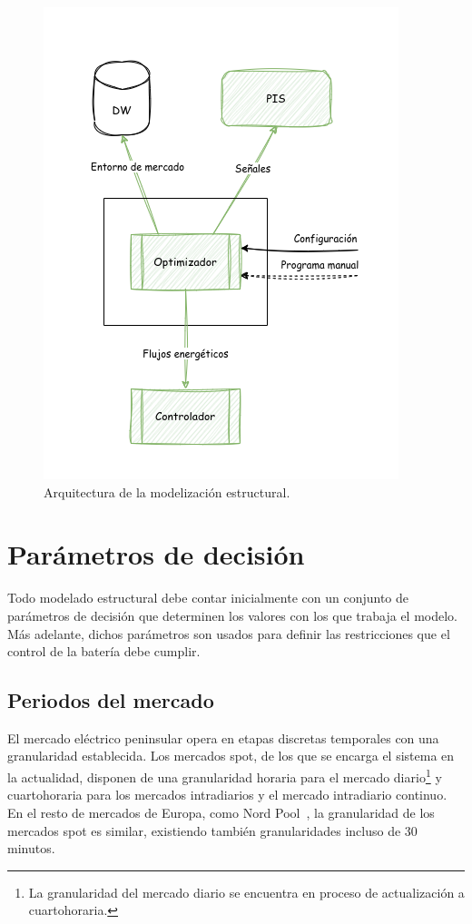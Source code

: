 \begin{figure}
  \centering
  \includegraphics[height=0.75\textheight]{figures/arquitectura-modelizacion.png}
  \caption[Arquitectura de la modelización estructural.]{Arquitectura de la modelización estructural.}%
  \label{fig:arquitectura-modelizacion}
\end{figure}

\section{Parámetros de decisión}%
\label{makereference5.1}

Todo modelado estructural debe contar inicialmente con un conjunto de parámetros de decisión que determinen los valores con los que trabaja el modelo. Más adelante, dichos parámetros son usados para definir las restricciones que el control de la batería debe cumplir.

\subsection{Periodos del mercado}%
\label{makereference5.1.1}

El mercado eléctrico peninsular opera en etapas discretas temporales con una granularidad establecida. Los mercados spot, de los que se encarga el sistema en la actualidad, disponen de una granularidad horaria para el mercado diario\footnote{La granularidad del mercado diario se encuentra en proceso de actualización a cuartohoraria.} y cuartohoraria para los mercados intradiarios y el mercado intradiario continuo. En el resto de mercados de Europa, como Nord Pool~\cite{nord2025leading}, la granularidad de los mercados spot es similar, existiendo también granularidades incluso de 30 minutos.

